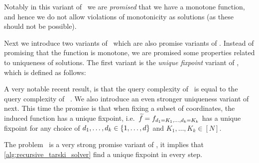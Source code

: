 
Notably in this variant of \Tarski\ we are \emph{promised} that we have a monotone function, and hence we do not allow violations of monotonicity as solutions (as these should not be possible).

Next we introduce two variants of \Tarski\ which are also promise variants of \Tarski. Instead of promising that the function is monotone, we are promised some properties related to uniqueness of solutions. The first variant is the \emph{unique fixpoint} variant of \Tarski, which is defined as follows:


A very notable recent result, is that the query complexity of \UniqueTarski\ is equal to the query complexity of \Tarski\ . We also introduce an even stronger uniqueness variant of \Tarski next. This time the promise is that when fixing a subset of coordinates, the induced function has a unique fixpoint, i.e.\ $\widetilde{f} = f_{d_1=K_1, \dots, d_k=K_k}$ has a unique fixpoint for any choice of $d_1, \dots, d_k \in \left\{1, \dots, d\right\}$ and $K_1, \dots, K_k \in [N]$.


The problem \SuperUniqueTarski\ is a very strong promise variant of \Tarski, it implies that \cref{alg:recursive_tarski_solver} find a unique fixpoint in every step.